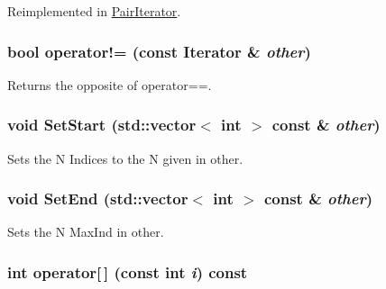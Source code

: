 Reimplemented in \hyperlink{classJKBuilder_1_1PairIterator_a6b4e430066f478e5e400edd39ef93968}{PairIterator}.\hypertarget{classJKBuilder_1_1Iterator_a8c06af8ae0d9d1614ae9f81629275926}{
\subsubsection[{operator!=}]{\setlength{\rightskip}{0pt plus 5cm}bool operator!= (const {\bf Iterator} \& {\em other})}}
\label{classJKBuilder_1_1Iterator_a8c06af8ae0d9d1614ae9f81629275926}


Returns the opposite of operator==. \hypertarget{classJKBuilder_1_1Iterator_aa83de505e29125c1d3ac7bb1b13ca15a}{
\subsubsection[{SetStart}]{\setlength{\rightskip}{0pt plus 5cm}void SetStart (std::vector$<$ int $>$ const \& {\em other})}}
\label{classJKBuilder_1_1Iterator_aa83de505e29125c1d3ac7bb1b13ca15a}


Sets the N Indices to the N given in other. \hypertarget{classJKBuilder_1_1Iterator_aad84ec668b5f41210db34c540aaa31fc}{
\subsubsection[{SetEnd}]{\setlength{\rightskip}{0pt plus 5cm}void SetEnd (std::vector$<$ int $>$ const \& {\em other})}}
\label{classJKBuilder_1_1Iterator_aad84ec668b5f41210db34c540aaa31fc}


Sets the N MaxInd in other. \hypertarget{classJKBuilder_1_1Iterator_a74247cf730a06b23fcb1ec64e5596b25}{
\subsubsection[{operator[]}]{\setlength{\rightskip}{0pt plus 5cm}int operator\mbox{[}$\,$\mbox{]} (const int {\em i}) const}}
\label{classJKBuilder_1_1Iterator_a74247cf730a06b23fcb1ec64e5596b25}


